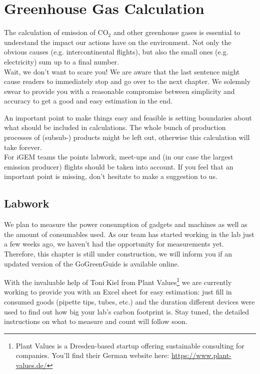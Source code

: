 
\chapter{Greenhouse Gas Calculation}\label{chap:calculation}

The calculation of emission of CO$_2$ and other greenhouse gases is essential to understand the impact our actions have on the environment. Not only the obvious causes (e.g. intercontinental flights), but also the small ones (e.g. electricity) sum up to a final number. \\
Wait, we don't want to scare you! We are aware that the last sentence might cause readers to immediately stop and go over to the next chapter.  We solemnly swear to provide you with a reasonable compromise between simplicity and accuracy to get a good and easy estimation in the end. 


An important point to make things easy and feasible is setting boundaries about what should be included in calculations. The whole bunch of production processes of (subsub-) products might be left out, otherwise this calculation will take forever. \\
For iGEM teams the points labwork, meet-ups and (in our case the largest emission producer) flights should be taken into account. If you feel that an important point is missing, don't hesitate to make a suggestion to us.

\section{Labwork}

We plan to measure the power consumption of gadgets and machines as well as the amount of consumables used. As our team has started working in the lab just a few weeks ago, we haven't had the opportunity for measurements yet. Therefore, this chapter is still under construction, we will inform you if an updated version of the GoGreenGuide is available online.


With the invaluable help of Toni Kiel from Plant Values\footnote{Plant Values is a Dresden-based startup offering sustainable consulting for companies. You'll find their German website here: \url{https://www.plant-values.de/}} we are currently working to provide you with an Excel sheet for easy estimation: just fill in consumed goods (pipette tips, tubes, etc.) and the duration different devices were used to find out how big your lab's carbon footprint is. Stay tuned, the detailed instructions on what to measure and count will follow soon.

